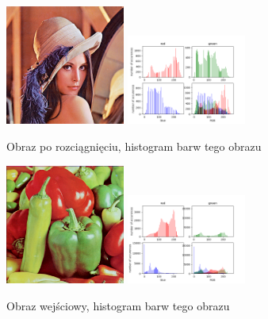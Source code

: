 \documentclass[final,a4paper,openany,12pt]{mwbk}
\begin{document}
\begin{figure}[H]
	\begin{center}
		\includegraphics[width=0.35\textwidth]{lena_color_stretchHist_result}
		\includegraphics[width=0.35\textwidth]{lena_color_stretchHist_histogram}
	\end{center}
	\caption{Obraz po rozciągnięciu, histogram barw tego obrazu}
\end{figure}

\begin{figure}[H]
	\begin{center}
		\includegraphics[width=0.35\textwidth]{peppers_color}
		\includegraphics[width=0.35\textwidth]{peppers_color_histogram}
	\end{center}
	\caption{Obraz wejściowy, histogram barw tego obrazu}
\end{figure}
\end{document}

